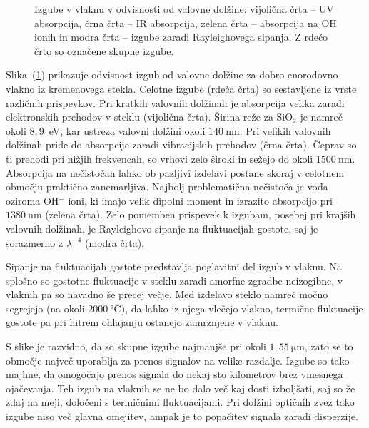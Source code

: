 \begin{figure}[h]
\centering
\def\svgwidth{90truemm} 
 
\caption{Izgube v vlaknu v odvisnosti od valovne dolžine: vijolična črta -- UV absorpcija, 
črna črta -- IR absorpcija, zelena črta -- absorpcija na OH ionih in modra črta --
izgube zaradi Rayleighovega sipanja. Z rdečo črto so označene skupne izgube.}
\label{FibAbs}
\end{figure}
Slika~(\ref{FibAbs}) prikazuje odvisnost izgub od valovne dolžine 
za dobro enorodovno vlakno iz kremenovega stekla. 
Celotne izgube (rdeča črta)
so sestavljene iz vrste različnih prispevkov. 
Pri kratkih valovnih dolžinah je absorpcija velika zaradi elektronskih prehodov
v steklu (vijolična črta). 
Širina reže za SiO$_2$ je namreč okoli $8,9$~eV, 
kar ustreza valovni dolžini
okoli $140~\si{\nano\meter}$. Pri velikih valovnih dolžinah pride do absorpcije zaradi
vibracijskih prehodov (črna črta). Čeprav so ti prehodi pri nižjih frekvencah, 
so vrhovi zelo široki in sežejo do okoli $1500~\si{\nano\meter}$. 
Absorpcija na nečistočah lahko ob pazljivi izdelavi postane skoraj v celotnem 
območju praktično zanemarljiva. 
Najbolj problematična nečistoča je voda oziroma OH$^{-}$ ioni, ki imajo velik dipolni
moment in izrazito absorpcijo pri $1380~\si{\nano\meter}$ (zelena črta). Zelo pomemben prispevek k 
izgubam, posebej pri krajših valovnih dolžinah, je Rayleighovo sipanje na fluktuacijah 
gostote, 
saj je sorazmerno z $\lambda^{-4}$ (modra črta). 

\begin{remark}
Sipanje na fluktuacijah gostote predstavlja poglavitni del izgub v vlaknu. Na splošno
so gostotne fluktuacije v steklu zaradi amorfne zgradbe neizogibne, v vlaknih
pa so navadno še precej večje. Med izdelavo steklo namreč močno segrejejo
(na okoli $2000~\si{\celsius}$), da lahko iz njega vlečejo vlakno, termične 
fluktuacije gostote pa pri hitrem ohlajanju ostanejo zamrznjene v vlaknu. 
\end{remark}

S slike je razvidno, da so skupne izgube najmanjše pri 
okoli $1,55~\si{\micro\meter}$, zato se to območje največ uporablja za prenos signalov
na velike razdalje. Izgube so tako majhne, da omogočajo prenos signala 
do nekaj sto kilometrov brez vmesnega ojačevanja. Teh izgub na vlaknih se  
ne bo dalo več kaj dosti izboljšati, saj so že zdaj na meji,
določeni s termičnimi fluktuacijami. Pri dolžini optičnih zvez tako izgube niso več glavna
omejitev, ampak je to popačitev signala zaradi disperzije.

